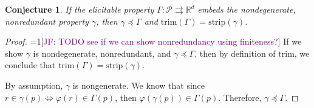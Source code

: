 \documentclass[12pt]{article}
\newcommand{\Comments}{1}
\newcommand{\mynote}[2]{\ifnum\Comments=1\textcolor{#1}{#2}\fi}
\newcommand{\jessie}[1]{\mynote{purple}{[JF: #1]}}
\newcommand{\reals}{\mathbb{R}}
\renewcommand{\P}{\mathcal{P}}
\newcommand{\R}{\mathcal{R}}
\newcommand{\toto}{\rightrightarrows}
\newcommand{\trim}{\mathrm{trim}}
\newcommand{\strip}{\mathrm{strip}}
\newtheorem{conjecture}{Conjecture}
\begin{document}
\begin{conjecture}\label{conj:prec-if-embeds}
If the elicitable property $\Gamma: \P \toto\reals^d$ embeds the nondegenerate, nonredundant property $\gamma$, then $\gamma \preceq \Gamma$ and $\trim(\Gamma) = \strip(\gamma)$.
\end{conjecture}
\begin{proof}
\jessie{TODO see if we can show nonredundancy using finiteness?}
If we show $\gamma$ is nondegenerate, nonredundant, and $\gamma \preceq \Gamma$, then by definition of $\trim$, we conclude that $\trim(\Gamma) = \strip(\gamma)$.	

By assumption, $\gamma$ is nongenerate.
We know that since $r \in \gamma(p) \iff \varphi(r) \in \Gamma(p)$, then $\varphi(\gamma(p)) \in \Gamma(p)$.
Therefore, $\gamma \preceq \Gamma$.


\end{proof}
\end{document}

